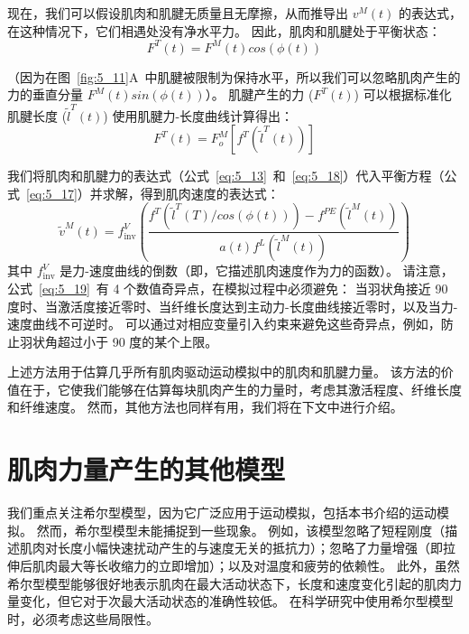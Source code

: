 现在，我们可以假设肌肉和肌腱无质量且无摩擦，从而推导出 $v^M(t)$ 的表达式，在这种情况下，它们相遇处没有净水平力。
因此，肌肉和肌腱处于平衡状态：
\begin{equation}
	F^T (t) = F^M (t) cos( \phi (t) )
	\label{eq:5_17}
\end{equation}

（因为在图~\ref{fig:5_11}A~中肌腱被限制为保持水平，所以我们可以忽略肌肉产生的力的垂直分量 $F^M(t) sin(\phi(t))$）。
肌腱产生的力 ($F^T(t)$) 可以根据标准化肌腱长度 ($\tilde{l} ^T (t)$) 使用肌腱力-长度曲线计算得出：
%
\begin{equation}
	F^T (t) = F_o ^M [
		f^T
		(
			\tilde{l} ^T (t)
		)
	]
	\label{eq:5_18}
\end{equation}

我们将肌肉和肌腱力的表达式（公式~\ref{eq:5_13}~和~\ref{eq:5_18}）代入平衡方程（公式~\ref{eq:5_17}）并求解，得到肌肉速度的表达式：
%
\begin{equation}
	\tilde{v} ^M (t) = 
		f_\text{inv} ^V
		(
			\frac{
				f^T (\tilde{l} ^T (T) / cos( \phi (t) ))
				- f^{PE} (\tilde{l} ^M (t))
			}{
				a(t) f^L ( \tilde{l}^M (t) )
			}
		)
	\label{eq:5_19}
\end{equation}
%
其中 $f_\text{inv} ^V$ 是力-速度曲线的倒数（即，它描述肌肉速度作为力的函数）。
请注意，公式~\ref{eq:5_19}~有 4 个数值奇异点，在模拟过程中必须避免：
当羽状角接近 90 度时、当激活度接近零时、当纤维长度达到主动力-长度曲线接近零时，以及当力-速度曲线不可逆时。
可以通过对相应变量引入约束来避免这些奇异点，例如，防止羽状角超过小于 90 度的某个上限。


上述方法用于估算几乎所有肌肉驱动运动模拟中的肌肉和肌腱力量。
该方法的价值在于，它使我们能够在估算每块肌肉产生的力量时，考虑其激活程度、纤维长度和纤维速度。
然而，其他方法也同样有用，我们将在下文中进行介绍。



\section{肌肉力量产生的其他模型}

我们重点关注希尔型模型，因为它广泛应用于运动模拟，包括本书介绍的运动模拟。
然而，希尔型模型未能捕捉到一些现象。
例如，该模型忽略了短程刚度（描述肌肉对长度小幅快速扰动产生的与速度无关的抵抗力）；忽略了力量增强（即拉伸后肌肉最大等长收缩力的立即增加）；以及对温度和疲劳的依赖性。
此外，虽然希尔型模型能够很好地表示肌肉在最大活动状态下，长度和速度变化引起的肌肉力量变化，但它对于次最大活动状态的准确性较低\cite{millard2013flexing}。
在科学研究中使用希尔型模型时，必须考虑这些局限性。


